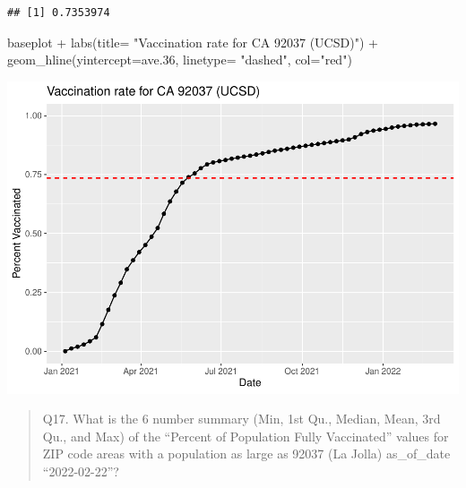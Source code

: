 \documentclass[
]{article}
\newenvironment{Shaded}{\begin{snugshade}}{\end{snugshade}}
\newcommand{\AttributeTok}[1]{\textcolor[rgb]{0.77,0.63,0.00}{#1}}
\newcommand{\ConstantTok}[1]{\textcolor[rgb]{0.00,0.00,0.00}{#1}}
\newcommand{\FloatTok}[1]{\textcolor[rgb]{0.00,0.00,0.81}{#1}}
\newcommand{\FunctionTok}[1]{\textcolor[rgb]{0.00,0.00,0.00}{#1}}
\newcommand{\NormalTok}[1]{#1}
\newcommand{\OtherTok}[1]{\textcolor[rgb]{0.56,0.35,0.01}{#1}}
\newcommand{\SpecialCharTok}[1]{\textcolor[rgb]{0.00,0.00,0.00}{#1}}
\newcommand{\StringTok}[1]{\textcolor[rgb]{0.31,0.60,0.02}{#1}}
\begin{document}
\begin{Shaded}
\end{Shaded}

\begin{verbatim}
## [1] 0.7353974
\end{verbatim}

\begin{Shaded}
\begin{Highlighting}[]
\NormalTok{baseplot }\SpecialCharTok{+} \FunctionTok{labs}\NormalTok{(}\AttributeTok{title=} \StringTok{"Vaccination rate for CA 92037 (UCSD)"}\NormalTok{) }\SpecialCharTok{+} \FunctionTok{geom\_hline}\NormalTok{(}\AttributeTok{yintercept=}\NormalTok{ave}\FloatTok{.36}\NormalTok{, }\AttributeTok{linetype=} \StringTok{"dashed"}\NormalTok{, }\AttributeTok{col=}\StringTok{"red"}\NormalTok{)}
\end{Highlighting}
\end{Shaded}

\includegraphics{COVID19-Vax-mini-project_files/figure-latex/unnamed-chunk-32-1.pdf}

\begin{quote}
Q17. What is the 6 number summary (Min, 1st Qu., Median, Mean, 3rd Qu.,
and Max) of the ``Percent of Population Fully Vaccinated'' values for
ZIP code areas with a population as large as 92037 (La Jolla)
as\_of\_date ``2022-02-22''?
\end{quote}
\end{document}
